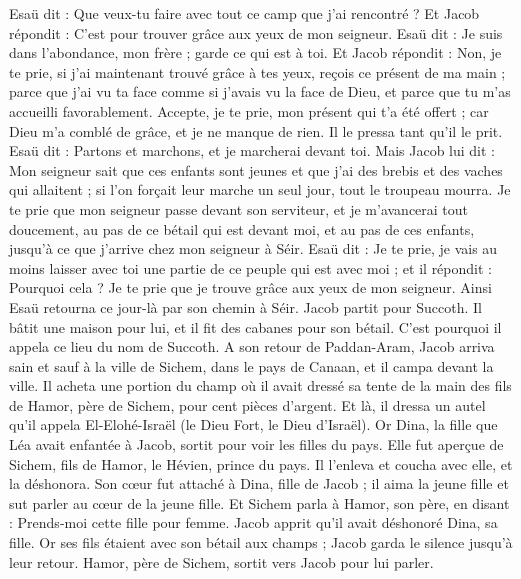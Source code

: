 \begin{multicols}{2}
Esaü dit : Que veux-tu faire avec tout ce camp que j'ai rencontré ? Et Jacob répondit : C'est pour trouver grâce aux yeux de mon seigneur.
Esaü dit : Je suis dans l'abondance, mon frère ; garde ce qui est à toi.
Et Jacob répondit : Non, je te prie, si j'ai maintenant trouvé grâce à tes yeux, reçois ce présent de ma main ; parce que j'ai vu ta face comme si j'avais vu la face de Dieu, et parce que tu m'as accueilli favorablement.
Accepte, je te prie, mon présent qui t'a été offert ; car Dieu m'a comblé de grâce, et je ne manque de rien. Il le pressa tant qu'il le prit.
Esaü dit : Partons et marchons, et je marcherai devant toi.
Mais Jacob lui dit : Mon seigneur sait que ces enfants sont jeunes et que j'ai des brebis et des vaches qui allaitent ; si l'on forçait leur marche un seul jour, tout le troupeau mourra.
Je te prie que mon seigneur passe devant son serviteur, et je m'avancerai tout doucement, au pas de ce bétail qui est devant moi, et au pas de ces enfants, jusqu'à ce que j'arrive chez mon seigneur à Séir.
Esaü dit : Je te prie, je vais au moins laisser avec toi une partie de ce peuple qui est avec moi ; et il répondit : Pourquoi cela ? Je te prie que je trouve grâce aux yeux de mon seigneur.
Ainsi Esaü retourna ce jour-là par son chemin à Séir.
Jacob partit pour Succoth. Il bâtit une maison pour lui, et il fit des cabanes pour son bétail. C'est pourquoi il appela ce lieu du nom de Succoth.
A son retour de Paddan-Aram, Jacob arriva sain et sauf à la ville de Sichem, dans le pays de Canaan, et il campa devant la ville.
Il acheta une portion du champ où il avait dressé sa tente de la main des fils de Hamor, père de Sichem, pour cent pièces d'argent.
Et là, il dressa un autel qu'il appela El-Elohé-Israël (le Dieu Fort, le Dieu d'Israël).
\VerseOne{}Or Dina, la fille que Léa avait enfantée à Jacob, sortit pour voir les filles du pays.
Elle fut aperçue de Sichem, fils de Hamor, le Hévien, prince du pays. Il l'enleva et coucha avec elle, et la déshonora.
Son cœur fut attaché à Dina, fille de Jacob ; il aima la jeune fille et sut parler au cœur de la jeune fille.
Et Sichem parla à Hamor, son père, en disant : Prends-moi cette fille pour femme.
Jacob apprit qu'il avait déshonoré Dina, sa fille. Or ses fils étaient avec son bétail aux champs ; Jacob garda le silence jusqu'à leur retour.
Hamor, père de Sichem, sortit vers Jacob pour lui parler.

\end{multicols}
